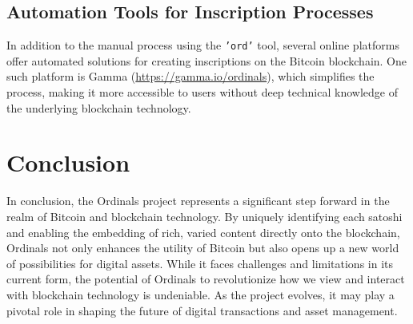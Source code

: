 \subsection{Automation Tools for Inscription Processes}
In addition to the manual process using the \texttt{'ord'} tool, 
several online platforms offer automated solutions for creating inscriptions on the Bitcoin blockchain. 
One such platform is Gamma (\href{https://gamma.io/ordinals}{https://gamma.io/ordinals}), 
which simplifies the process, making it more accessible to users without deep technical knowledge of the underlying blockchain technology.

\section{Conclusion}
In conclusion, the Ordinals project represents a significant step forward in the realm of Bitcoin and blockchain technology. By uniquely identifying each satoshi and enabling the embedding of rich, varied content directly onto the blockchain, Ordinals not only enhances the utility of Bitcoin but also opens up a new world of possibilities for digital assets. While it faces challenges and limitations in its current form, the potential of Ordinals to revolutionize how we view and interact with blockchain technology is undeniable. As the project evolves, it may play a pivotal role in shaping the future of digital transactions and asset management.